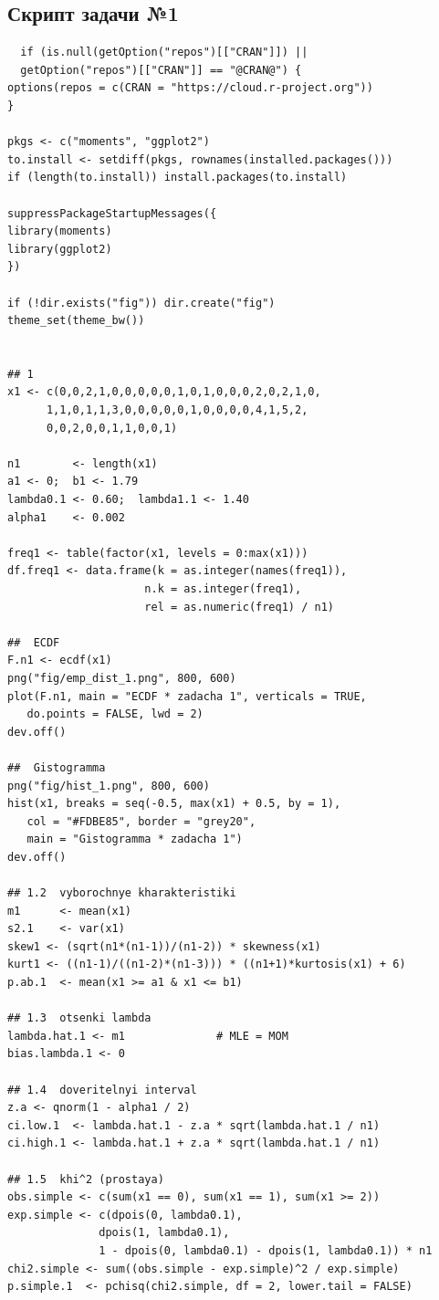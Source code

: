 \documentclass[areasetadvanced]{scrartcl}
\begin{document}
\subsection*{Скрипт задачи №1}
\begin{lstlisting}
  if (is.null(getOption("repos")[["CRAN"]]) ||
  getOption("repos")[["CRAN"]] == "@CRAN@") {
options(repos = c(CRAN = "https://cloud.r-project.org"))
}

pkgs <- c("moments", "ggplot2")
to.install <- setdiff(pkgs, rownames(installed.packages()))
if (length(to.install)) install.packages(to.install)

suppressPackageStartupMessages({
library(moments)
library(ggplot2)
})

if (!dir.exists("fig")) dir.create("fig")
theme_set(theme_bw())


## 1
x1 <- c(0,0,2,1,0,0,0,0,0,1,0,1,0,0,0,2,0,2,1,0,
      1,1,0,1,1,3,0,0,0,0,0,1,0,0,0,0,4,1,5,2,
      0,0,2,0,0,1,1,0,0,1)

n1        <- length(x1)
a1 <- 0;  b1 <- 1.79
lambda0.1 <- 0.60;  lambda1.1 <- 1.40
alpha1    <- 0.002

freq1 <- table(factor(x1, levels = 0:max(x1)))
df.freq1 <- data.frame(k = as.integer(names(freq1)),
                     n.k = as.integer(freq1),
                     rel = as.numeric(freq1) / n1)

##  ECDF
F.n1 <- ecdf(x1)
png("fig/emp_dist_1.png", 800, 600)
plot(F.n1, main = "ECDF * zadacha 1", verticals = TRUE,
   do.points = FALSE, lwd = 2)
dev.off()

##  Gistogramma
png("fig/hist_1.png", 800, 600)
hist(x1, breaks = seq(-0.5, max(x1) + 0.5, by = 1),
   col = "#FDBE85", border = "grey20",
   main = "Gistogramma * zadacha 1")
dev.off()

## 1.2  vyborochnye kharakteristiki 
m1      <- mean(x1)
s2.1    <- var(x1)
skew1 <- (sqrt(n1*(n1-1))/(n1-2)) * skewness(x1)
kurt1 <- ((n1-1)/((n1-2)*(n1-3))) * ((n1+1)*kurtosis(x1) + 6)
p.ab.1  <- mean(x1 >= a1 & x1 <= b1)

## 1.3  otsenki lambda 
lambda.hat.1 <- m1              # MLE = MOM
bias.lambda.1 <- 0

## 1.4  doveritelnyi interval 
z.a <- qnorm(1 - alpha1 / 2)
ci.low.1  <- lambda.hat.1 - z.a * sqrt(lambda.hat.1 / n1)
ci.high.1 <- lambda.hat.1 + z.a * sqrt(lambda.hat.1 / n1)

## 1.5  khi^2 (prostaya) 
obs.simple <- c(sum(x1 == 0), sum(x1 == 1), sum(x1 >= 2))
exp.simple <- c(dpois(0, lambda0.1),
              dpois(1, lambda0.1),
              1 - dpois(0, lambda0.1) - dpois(1, lambda0.1)) * n1
chi2.simple <- sum((obs.simple - exp.simple)^2 / exp.simple)
p.simple.1  <- pchisq(chi2.simple, df = 2, lower.tail = FALSE)


\end{lstlisting}
\end{document}
